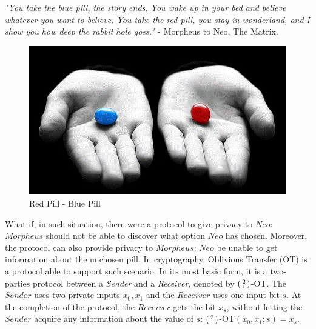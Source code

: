 \textit{"You take the blue pill, the story ends. You wake up in your bed and
  believe whatever you want to believe. You take the red pill, you stay in
  wonderland, and I show you how deep the rabbit hole goes."} - Morpheus to Neo,
The Matrix.


\begin{figure}[htbp!] 
\centering    
\includegraphics[width=1.0\textwidth]{Chapter2/Figs/Raster/RedPillBluePill}
\caption[Minion]{Red Pill - Blue Pill}
\label{fig:RedPillBluePill}
\end{figure}

What if, in such situation, there were a protocol to give privacy to
\(Neo\): \(Morpheus\) should not be able to discover what option \(Neo\) has chosen. Moreover, the
protocol can also provide privacy to \(Morpheus\): \(Neo\) be unable to get information about the unchosen pill. In cryptography, Oblivious Transfer (OT) is a
protocol able to support such scenario. 
In its most basic form, it is a
two-parties protocol between a \textit{Sender} and a \textit{Receiver}, denoted
by \(\begin{psmallmatrix} 2 \\ 1 \end{psmallmatrix} \)-OT. The \(Sender\) uses
two private inputs \(x_{0}, x_{1}\) and the \(Receiver\) uses one input bit
\(s\). At the completion of the protocol, the \(Receiver\) gets the bit
\(x_{s}\), without letting the \(Sender\) acquire any information about the value of
\(s\): \(\begin{psmallmatrix} 2 \\ 1 \end{psmallmatrix}
\)-OT\((x_{0},x_{1};s) = x_{s}\).


